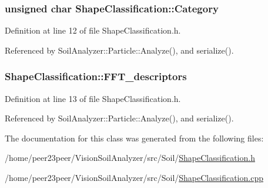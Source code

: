 \subsubsection[{Category}]{\setlength{\rightskip}{0pt plus 5cm}unsigned char Shape\+Classification\+::\+Category}\label{class_shape_classification_a5b723e358b86496ed6f4b25e2bf7af17}


Definition at line 12 of file Shape\+Classification.\+h.



Referenced by Soil\+Analyzer\+::\+Particle\+::\+Analyze(), and serialize().

\hypertarget{class_shape_classification_afecc3c98ca8a930b359ddd936aad21f3}{}
\subsubsection[{F\+F\+T\+\_\+descriptors}]{ Shape\+Classification\+::\+F\+F\+T\+\_\+descriptors}\label{class_shape_classification_afecc3c98ca8a930b359ddd936aad21f3}


Definition at line 13 of file Shape\+Classification.\+h.



Referenced by Soil\+Analyzer\+::\+Particle\+::\+Analyze(), and serialize().



The documentation for this class was generated from the following files\+:\begin{DoxyCompactItemize}
\item 
/home/peer23peer/\+Vision\+Soil\+Analyzer/src/\+Soil/\hyperlink{_shape_classification_8h}{Shape\+Classification.\+h}\item 
/home/peer23peer/\+Vision\+Soil\+Analyzer/src/\+Soil/\hyperlink{_shape_classification_8cpp}{Shape\+Classification.\+cpp}\end{DoxyCompactItemize}
